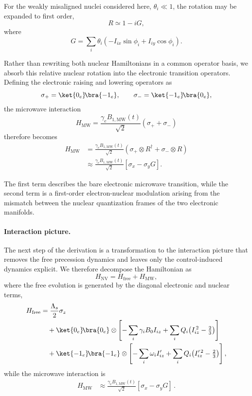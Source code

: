 For the weakly misaligned nuclei considered here,  \(\theta_i\ll1\), the rotation may be expanded to first order,
\[
R
\simeq
1-iG,
\]
where
\[
G
=
\sum_i\theta_i
\left(
-I_{ix}\sin\phi_i
+
I_{iy}\cos\phi_i
\right).
\]

Rather than rewriting both nuclear Hamiltonians in a common operator basis, we absorb this relative nuclear rotation into the electronic transition operators. Defining the electronic raising and lowering operators as
\[
\sigma_+
=
\ket{0_e}\!\bra{-1_e},
\qquad
\sigma_-
=
\ket{-1_e}\!\bra{0_e},
\]
the microwave interaction
\[
H_{\mathrm{MW}}
=
\frac{\gamma_eB_{1,\mathrm{MW}}(t)}{\sqrt2}
(\sigma_+ + \sigma_-)
\]
therefore becomes
\begin{equation}
\begin{aligned}
H_{\mathrm{MW}}
&=
\frac{\gamma_eB_{1,\mathrm{MW}}(t)}{\sqrt2}
\left(
\sigma_+\otimes R^\dagger
+
\sigma_-\otimes R
\right)
\\
&\approx
\frac{\gamma_eB_{1,\mathrm{MW}}(t)}{\sqrt2}
\left[
\sigma_x
-
\sigma_y G
\right].
\end{aligned}
\label{eq:HMW_rot}
\end{equation}

The first term describes the bare electronic microwave transition, while the second term is a first-order electron-nuclear modulation arising from the mismatch between the nuclear quantization frames of the two electronic manifolds.\\




\paragraph{Interaction picture.}

The next step of the derivation is a transformation to the interaction picture that removes the free precession dynamics and leaves only the control-induced dynamics explicit. We therefore decompose the Hamiltonian as
\begin{equation}
H_{\mathrm{NV}}
=
H_{\mathrm{free}}
+
H_{\mathrm{MW}},
\label{eq:H_split}
\end{equation}
where the free evolution is generated by the diagonal electronic and nuclear
terms,
\begin{equation}
\begin{aligned}
H_{\mathrm{free}}
&=
\frac{\Lambda_s}{2}\sigma_z
\\
&\quad
+
\ket{0_e}\!\bra{0_e}\otimes
\left[
-\sum_i\gamma_iB_0 I_{iz}
+
\sum_iQ_i\!\left(I_{iz}^{\,2}-\tfrac23\right)
\right]
\\
&\quad
+
\ket{-1_e}\!\bra{-1_e}\otimes
\left[
-\sum_i\omega_i I'_{iz}
+
\sum_iQ_i\!\left(I_{iz}'^{\,2}-\tfrac23\right)
\right],
\end{aligned}
\label{eq:H_free}
\end{equation}
while the microwave interaction is
\begin{equation}
\begin{aligned}
H_{\mathrm{MW}}
&\approx
\frac{\gamma_e B_{1,\mathrm{MW}}(t)}{\sqrt2}
\left[
\sigma_x
-
\sigma_y G
\right]\,.
\end{aligned}
\label{eq:HMW_rot}
\end{equation}


